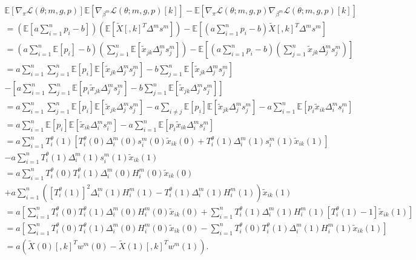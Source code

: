 \documentclass[12pt]{article}
\begin{document}
\begin{appendices}
\begin{refsection}
\begin{multline}
		\mathbb{E} \left[\nabla_\pi \mathcal{L}(\theta; m, g, p) \right] \mathbb{E}\left[\nabla_{\beta^m} \mathcal{L}(\theta; m, g, p)[k] \right] - \mathbb{E} \left[\nabla_{\pi}\mathcal{L}(\theta; m,g,p) \nabla_{\beta^m}\mathcal{L}(\theta; m,g,p)[k] \right] \\= \left(\mathbb{E} \left[ a \sum_{i=1}^n p_i - b \right] \right) \left(\mathbb{E}\left[ \tilde{X}[,k]^T \Delta^m s^m \right] \right) - \mathbb{E} \left[ \left( a \sum_{i=1}^n p_i - b \right) \tilde{X}[,k]^T \Delta^m s^m \right] \\ = \left( a \sum_{i=1}^n \mathbb{E}[p_i] - b \right) \left( \sum_{j=1}^n \mathbb{E} [ \tilde{x}_{jk}\Delta^m_js^m_j] \right) - \mathbb{E} \left[ \left( a \sum_{i=1}^n p_i - b \right) \left( \sum_{j=1}^n \tilde{x}_{jk} \Delta^m_j s^m_j \right) \right] \\ = a \sum_{i=1}^n \sum_{j=1}^n \mathbb{E} [p_i] \mathbb{E}[ \tilde{x}_{jk} \Delta^m_j s^m_j] - b \sum_{j=1}^n \mathbb{E}[\tilde{x}_{jk} \Delta^m_j s^m_j] \\ - \left[ a \sum_{i=1}^n \sum_{j=1}^n \mathbb{E} [ p_i \tilde{x}_{jk} \Delta^m_j s^m_j] - b \sum_{j=1}^n \mathbb{E}[\tilde{x}_{jk} \Delta^m_j s^m_j] \right] \\ =  a \sum_{i=1}^n \sum_{j=1}^n \mathbb{E}[p_i] \mathbb{E}[\tilde{x}_{jk} \Delta^m_j s^m_j] - a\sum_{i \neq j} \mathbb{E}[p_i] \mathbb{E}[\tilde{x}_{jk} \Delta^m_j s^m_j] - a\sum_{i=1}^n \mathbb{E}[ p_i \tilde{x}_{ik} \Delta^m_i s^m_i ] \\ = a \sum_{i=1}^n \mathbb{E}[p_i] \mathbb{E}[ \tilde{x}_{ik} \Delta^m_i s^m_i] - a \sum_{i=1}^n \mathbb{E}[p_i \tilde{x}_{ik} \Delta^m_i s^m_i] \\ = a \sum_{i=1}^n T^\theta_i(1) [T^\theta_i(0) \Delta^m_i(0) s^m_i(0) \tilde{x}_{ik}(0) + T^\theta_i(1) \Delta^m_i(1) s^m_i(1) \tilde{x}_{ik}(1)] \\ - a \sum_{i=1}^n T^\theta_i(1)\Delta^m_i(1)s^m_i(1)\tilde{x}_{ik}(1) \\ = a \sum_{i=1}^n T^\theta_i(0)T^\theta_i(1) \Delta_i^m(0)H^m_i(0)\tilde{x}_{ik}(0) \\ + a \sum_{i=1}^n \left( [T^\theta_i(1)]^2 \Delta^m_i(1)H^m_i(1) - T^\theta_i(1)\Delta^m_i(1)H^m_i(1) \right) \tilde{x}_{ik}(1)  \\ =a \left[ \sum_{i=1}^n T^\theta_i(0) T^\theta_i(1) \Delta^m_i(0) H^m_i(0) \tilde{x}_{ik}(0) + \sum_{i=1}^n T^\theta_i(1)\Delta^m_i(1)H^m_i(1)[T^\theta_i(1) - 1] \tilde{x}_{ik}(1) \right] \\ = a \left[ \sum_{i=1}^n T^\theta_i(0) T^\theta_i(1) \Delta^m_i(0) H^m_i(0) \tilde{x}_{ik}(0) - \sum_{i=1}^n T^\theta_i(0) T^\theta_i(1) \Delta^m_i(1) H^m_i(1) \tilde{x}_{ik}(1) \right] \\ = a\left(\tilde{X}(0)[,k]^T w^m(0) - \tilde{X}(1)[,k]^T w^m(1)  \right).

\end{multline}
\end{refsection}
\end{appendices}
\end{document}
